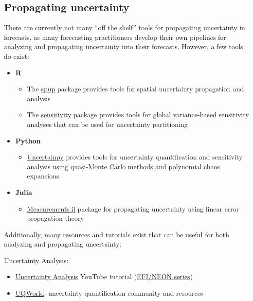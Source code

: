 \documentclass[
]{book}
\providecommand{\tightlist}{%
  \setlength{\itemsep}{0pt}\setlength{\parskip}{0pt}}
\begin{document}
\hypertarget{propagating-uncertainty}{%
\subsection{Propagating uncertainty}\label{propagating-uncertainty}}

There are currently not many ``off the shelf'' tools for propagating uncertainty in forecasts, as many forecasting practitioners develop their own pipelines for analyzing and propagating uncertainty into their forecasts. However, a few tools do exist:

\begin{itemize}
\tightlist
\item
  \textbf{R}

  \begin{itemize}
  \tightlist
  \item
    The \href{https://rjournal.github.io/archive/2018/RJ-2018-047/index.html}{spup} package provides tools for spatial uncertainty propagation and analysis
  \item
    The \href{https://cran.r-project.org/web/packages/sensitivity/index.html}{sensitivity} package provides tools for global variance-based sensitivity analyses that can be used for uncertainty partitioning
  \end{itemize}
\item
  \textbf{Python}

  \begin{itemize}
  \tightlist
  \item
    \href{https://uncertainpy.readthedocs.io/en/latest/}{Uncertainpy} provides tools for uncertainty quantification and sensitivity analysis using quasi-Monte Carlo methods and polynomial chaos expansions
  \end{itemize}
\item
  \textbf{Julia}

  \begin{itemize}
  \tightlist
  \item
    \href{https://juliaphysics.github.io/Measurements.jl/stable/}{Measurements.jl} package for propagating uncertainty using linear error propagation theory
  \end{itemize}
\end{itemize}

Additionally, many resources and tutorials exist that can be useful for both analyzing and propagating uncertainty:

Uncertainty Analysis:

\begin{itemize}
\tightlist
\item
  \href{https://youtu.be/rDCkjzVQNSw}{Uncertainty Analysis} YouTube tutorial (\href{https://www.youtube.com/watch?v=kq0DTcotpA0\&list=PLLWiknuNGd50Lc3rft4kFPc_oxAhiQ-6s}{EFI/NEON series})
\item
  \href{https://uqworld.org/}{UQWorld}: uncertainty quantification community and resources
\end{itemize}
\end{document}
